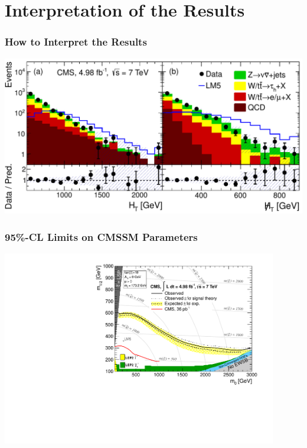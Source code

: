 \documentclass{beamer}
\begin{document}
\section{Interpretation of the Results}
\begin{frame}
  \frametitle{How to Interpret the Results}
  \begin{center}
    \includegraphics[width=\textwidth]{figures/RA2DataVsEstimatedBkg.pdf}
  \end{center}
\end{frame}

\begin{frame}
  \frametitle{95\%-CL Limits on CMSSM Parameters}
  \begin{center}
    \includegraphics[width=0.9\textwidth]{figures/cMSSM_Mzero_Mhalf_Exclusion.pdf}
  \end{center}
\end{frame}
\end{document}
